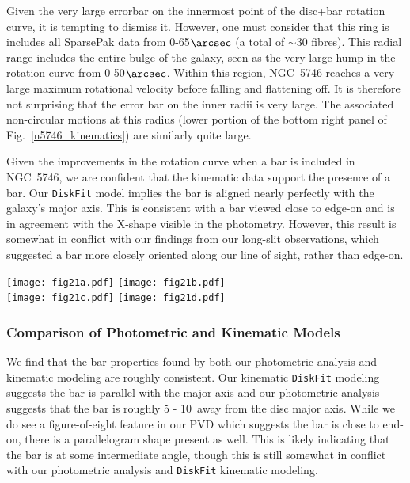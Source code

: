\documentclass[a4paper,fleqn,usenatbib]{mnras}
\begin{document}
Given the very large errorbar on the innermost point of the disc+bar rotation curve, it is tempting to dismiss it.  However, one must consider that this ring is includes all  SparsePak data from 0-65$\arcsec$ (a total of $\sim$30 fibres). This radial range includes the entire bulge of the galaxy, seen as the very large hump in the rotation curve from 0-50$\arcsec$.  Within this region, NGC~5746 reaches a very large maximum rotational velocity before falling and flattening off. It is therefore not surprising that the error bar on the inner radii is very large. The associated non-circular motions at this radius (lower portion of the bottom right panel of Fig.~\ref{n5746_kinematics}) are similarly quite large.  

Given the improvements in the rotation curve when a bar is included in NGC~5746, we are confident that the kinematic data support the presence of a bar. Our \texttt{DiskFit} model implies the bar is aligned nearly perfectly with the galaxy's major axis. This is consistent with a bar viewed close to edge-on and is in agreement with the X-shape visible in the photometry. However, this result is somewhat in conflict with our findings from our long-slit observations, which suggested a bar more closely oriented along our line of sight, rather than edge-on.

\begin{figure*}
	\center
    	\hskip 10mm \texttt{[image: fig21a.pdf]} \hskip 2mm \texttt{[image: fig21b.pdf]}\\
	\hskip 2mm
    	\texttt{[image: fig21c.pdf]} \hskip 2mm \texttt{[image: fig21d.pdf]}
  	\caption{Same as Fig.~\ref{n6674_kinematics} but for NGC~5746.}
  	\label{n5746_kinematics}
\end{figure*}
  
\subsubsection{Comparison of Photometric and Kinematic Models}
\label{sec:n5746compare}

We find that the bar properties found by both our photometric analysis and kinematic modeling are roughly consistent. Our kinematic \texttt{DiskFit} modeling suggests the bar is parallel with the major axis and our photometric analysis suggests that the bar is roughly 5 - 10\degr\ away from the disc major axis. While we do see a figure-of-eight feature in our PVD which suggests the bar is close to end-on, there is a parallelogram shape present as well. This is likely indicating that the bar is at some intermediate angle, though this is still somewhat in conflict with our photometric analysis and \texttt{DiskFit} kinematic modeling.
\end{document}
